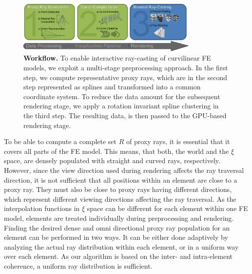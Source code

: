 \documentclass[review,journal]{vgtc}         %
\begin{document}
\begin{figure}[t]
    \centering
    \includegraphics[width=0.8\textwidth]{figures/workflow-new.pdf}
    \caption{\textbf{Workflow.} To enable interactive ray-casting of curvilinear FE models, we exploit a multi-stage preprocessing approach. In the first step, we compute representative proxy rays, which are in the second step represented as splines and transformed into a common coordinate system. To reduce the data amount for the subsequent rendering stage, we apply a rotation invariant spline clustering in the third step. The resulting data, is then passed to the GPU-based rendering stage.}
    \label{fig:workflow}
\end{figure}

To be able to compute a complete set $R$ of proxy rays, it is essential that it covers all parts of the FE model. This means, that both, the world and the $\xi$ space, are densely populated with straight and curved rays, respectively. However, since the view direction used during rendering affects the ray traversal direction, it is not sufficient that all positions within an element are close to a proxy ray. They must also be close to proxy rays having different directions, which represent different viewing directions affecting the ray traversal. As the interpolation functions in $\xi$ space can be different for each element within one FE model, elements are treated individually during preprocessing and rendering. Finding the desired dense and omni directional proxy ray population for an element can be performed in two ways. It can be either done adaptively by analyzing the actual ray distribution within each element, or in a uniform way over each element. As our algorithm is based on the inter- and intra-element coherence, a uniform ray distribution is sufficient.
\end{document}
